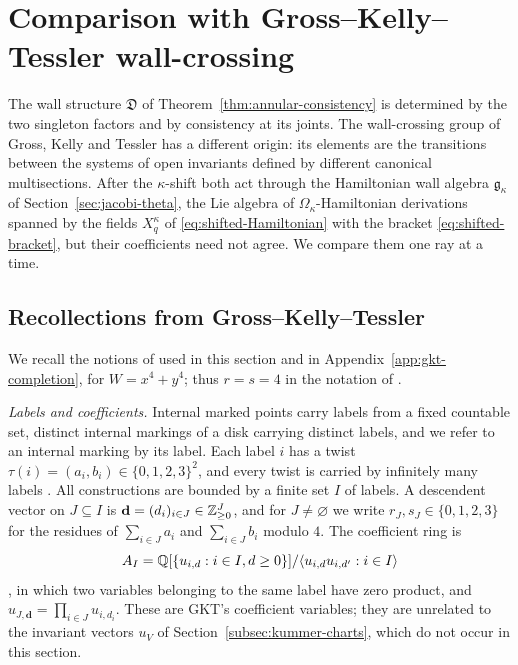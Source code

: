 \section{Comparison with Gross--Kelly--Tessler wall-crossing}
\label{sec:gkt-decoration}

The wall structure $\mathfrak D$ of Theorem~\ref{thm:annular-consistency} is
determined by the two singleton factors and by consistency at its joints.
The wall-crossing group of Gross, Kelly and Tessler has a different origin:
its elements are the transitions between the systems of open invariants
defined by different canonical multisections.  After the $\kappa$-shift
both act through the Hamiltonian wall algebra $\mathfrak g_\kappa$ of
Section~\ref{sec:jacobi-theta}, the Lie algebra of $\Omega_\kappa$-Hamiltonian
derivations spanned by the fields $X^\kappa_q$ of
\eqref{eq:shifted-Hamiltonian} with the bracket \eqref{eq:shifted-bracket},
but their coefficients need not agree.  We compare them one ray at a time.

\subsection{Recollections from Gross--Kelly--Tessler}
\label{subsec:gkt-recollections}

We recall the notions of \cite{grossetal2022open} used in this section and
in Appendix~\ref{app:gkt-completion}, for $W=x^4+y^4$; thus $r=s=4$ in the
notation of \cite{grossetal2022open}.

\emph{Labels and coefficients.}  Internal marked points carry labels from a
fixed countable set, distinct internal markings of a disk carrying distinct
labels, and we refer to an internal marking by its label.  Each label $i$
has a twist
$\tau(i)=(a_i,b_i)\in\{0,1,2,3\}^2$, and every twist is carried by
infinitely many labels \cite[\S0.1]{grossetal2022open}.  All constructions
are bounded by a finite set $I$ of labels.  A descendent vector on
$J\subseteq I$ is $\mathbf d=(d_i)_{i\in J}\in\mathbb Z_{\geq0}^J$, and for
$J\neq\varnothing$ we write $r_J,s_J\in\{0,1,2,3\}$ for the residues of
$\sum_{i\in J}a_i$ and $\sum_{i\in J}b_i$ modulo $4$.  The coefficient ring is
\begin{equation}\label{eq:labelled-ring}
 A_I
 =\mathbb Q[\{u_{i,d}:i\in I, d\geq0\}]
  /\langle u_{i,d}u_{i,d'}:i\in I\rangle
\end{equation}
\cite[Def.~4.6]{grossetal2022open}, in which two variables belonging to the
same label have zero product, and $u_{J,\mathbf d}=\prod_{i\in J}u_{i,d_i}$.
These are GKT's coefficient variables; they are unrelated to the invariant
vectors $u_V$ of Section~\ref{subsec:kummer-charts}, which do not occur in
this section.

